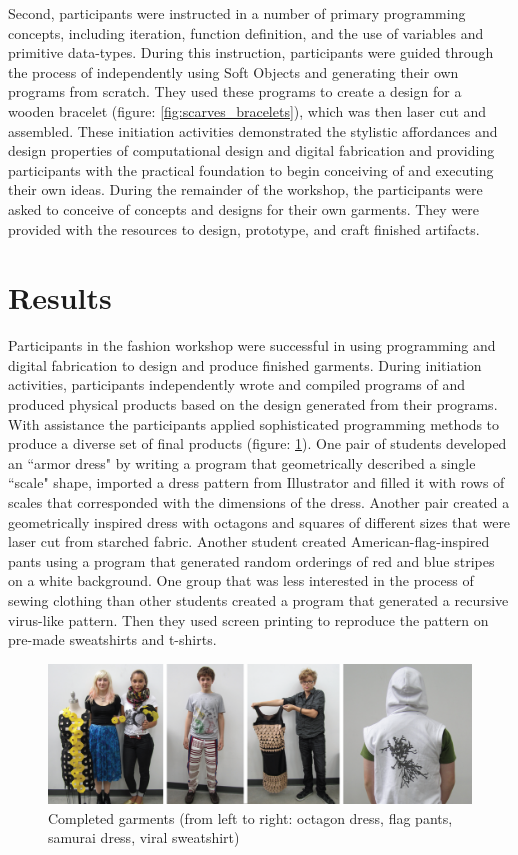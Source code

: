 Second, participants were instructed in a number of primary programming concepts, including iteration, function definition, and the use of variables and primitive data-types. During this instruction, participants were guided through the process of independently using Soft Objects and generating their own programs from scratch. They used these programs to create a design for a wooden bracelet (figure: \ref{fig:scarves_bracelets}), which was then laser cut and assembled. These initiation activities demonstrated the stylistic affordances and design properties of computational design and digital fabrication and  providing participants with the practical foundation to begin conceiving of and executing their own ideas. During the remainder of the workshop, the participants were asked to conceive of concepts and designs for their own garments. They were provided with the resources to design, prototype, and craft finished artifacts.

\section{Results}
Participants in the fashion workshop were successful in using programming and digital fabrication to design and produce finished garments. During initiation activities, participants independently wrote and compiled programs of  and produced physical products based on the design generated from their programs. With assistance the participants applied sophisticated programming methods to produce a diverse set of final products (figure: \ref{fig:fashion_results}). One pair of students developed an ``armor dress" by writing a program that geometrically described a single ``scale" shape, imported a dress pattern from Illustrator and filled it with rows of scales that corresponded with the dimensions of the dress. Another pair created a geometrically inspired dress with octagons and squares of different sizes that were laser cut from starched fabric. Another student created American-flag-inspired pants using a program that generated random orderings of red and blue stripes on a white background. One group that was less interested in the process of sewing clothing than other students created a program that generated a recursive virus-like pattern. Then they used screen printing to reproduce the pattern on pre-made  sweatshirts and t-shirts.

\begin{center}
\begin{figure}[h!]
\includegraphics[width=6.5in]{images/fashion_results.png}
\caption{Completed garments (from left to right: octagon dress, flag pants, samurai dress, viral sweatshirt)}
\label{fig:fashion_results}
\end{figure}
\end{center}


